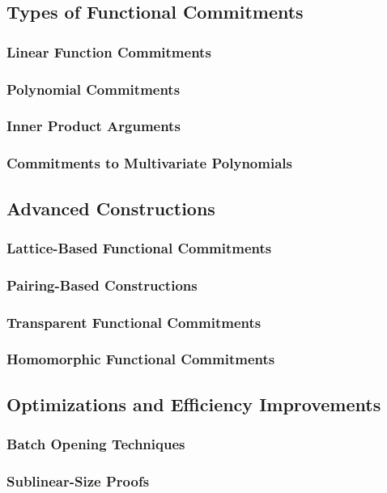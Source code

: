 \documentclass{iacrtrans}
\begin{document}
\subsection{Types of Functional Commitments}
\subsubsection{Linear Function Commitments}
\subsubsection{Polynomial Commitments}
\subsubsection{Inner Product Arguments}
\subsubsection{Commitments to Multivariate Polynomials}

\subsection{Advanced Constructions}
\subsubsection{Lattice-Based Functional Commitments}
\subsubsection{Pairing-Based Constructions}
\subsubsection{Transparent Functional Commitments}
\subsubsection{Homomorphic Functional Commitments}

\subsection{Optimizations and Efficiency Improvements}
\subsubsection{Batch Opening Techniques}
\subsubsection{Sublinear-Size Proofs}
\end{document}
